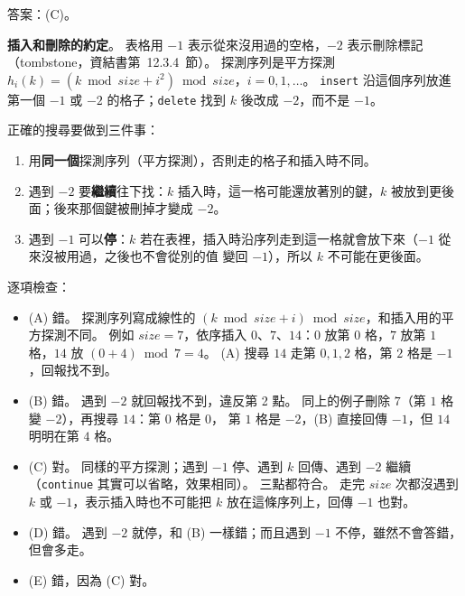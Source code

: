 \begin{pastsoln}
答案：(C)。

\textbf{插入和刪除的約定}。 表格用 $-1$ 表示從來沒用過的空格，$-2$ 表示刪除標記（tombstone，資結書第~12.3.4~節）。
探測序列是平方探測 $h_i(k) = (k \bmod \mathit{size} + i^2) \bmod \mathit{size}$，$i = 0, 1, \ldots$。 \texttt{insert}
沿這個序列放進第一個 $-1$ 或 $-2$ 的格子；\texttt{delete} 找到 $k$ 後改成 $-2$，而不是 $-1$。

正確的搜尋要做到三件事：
\begin{enumerate}
\item 用\textbf{同一個}探測序列（平方探測），否則走的格子和插入時不同。
\item 遇到 $-2$ 要\textbf{繼續}往下找：$k$ 插入時，這一格可能還放著別的鍵，$k$ 被放到更後面；後來那個鍵被刪掉才變成 $-2$。
\item 遇到 $-1$ 可以\textbf{停}：$k$ 若在表裡，插入時沿序列走到這一格就會放下來（$-1$ 從來沒被用過，之後也不會從別的值
變回 $-1$），所以 $k$ 不可能在更後面。
\end{enumerate}

逐項檢查：
\begin{itemize}
\item (A) 錯。 探測序列寫成線性的 $(k \bmod \mathit{size} + i) \bmod \mathit{size}$，和插入用的平方探測不同。 例如
$\mathit{size} = 7$，依序插入 $0$、$7$、$14$：$0$ 放第 $0$ 格，$7$ 放第 $1$ 格，$14$ 放 $(0 + 4) \bmod 7 = 4$。 (A) 搜尋 $14$
走第 $0, 1, 2$ 格，第 $2$ 格是 $-1$，回報找不到。
\item (B) 錯。 遇到 $-2$ 就回報找不到，違反第 2 點。 同上的例子刪除 $7$（第 $1$ 格變 $-2$），再搜尋 $14$：第 $0$ 格是 $0$，
第 $1$ 格是 $-2$，(B) 直接回傳 $-1$，但 $14$ 明明在第 $4$ 格。
\item (C) 對。 同樣的平方探測；遇到 $-1$ 停、遇到 $k$ 回傳、遇到 $-2$ 繼續（\texttt{continue} 其實可以省略，效果相同）。
三點都符合。 走完 $\mathit{size}$ 次都沒遇到 $k$ 或 $-1$，表示插入時也不可能把 $k$ 放在這條序列上，回傳 $-1$ 也對。
\item (D) 錯。 遇到 $-2$ 就停，和 (B) 一樣錯；而且遇到 $-1$ 不停，雖然不會答錯，但會多走。
\item (E) 錯，因為 (C) 對。
\end{itemize}
\end{pastsoln}
